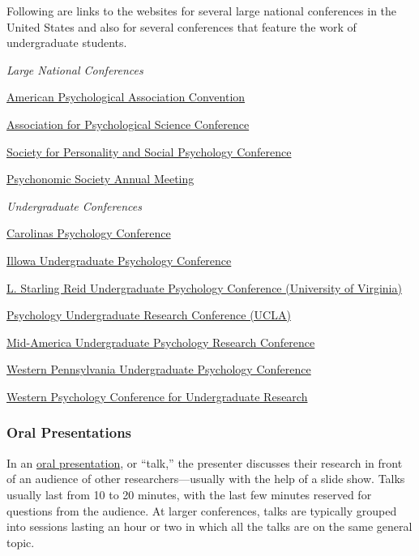 \documentclass[
]{krantz}
\begin{document}
Following are links to the websites for several large national conferences in the United States and also for several conferences that feature the work of undergraduate students.

\emph{Large National Conferences}

\href{https://convention.apa.org/}{American Psychological Association Convention}

\href{https://www.psychologicalscience.org/conventions}{Association for Psychological Science Conference}

\href{https://spsp.org/events/annual-convention}{Society for Personality and Social Psychology Conference}

\href{https://www.psychonomic.org/page/meetings}{Psychonomic Society Annual Meeting}

\emph{Undergraduate Conferences}

\href{https://education.campbell.edu/psychology/carolinas-psychology-conference/}{Carolinas Psychology Conference}

\href{http://research.monm.edu/illowa/}{Illowa Undergraduate Psychology Conference}

\href{https://psychology.as.virginia.edu/reid-conference}{L. Starling Reid Undergraduate Psychology Conference (University of Virginia)}

\href{https://purc.psych.ucla.edu/}{Psychology Undergraduate Research Conference (UCLA)}

\href{https://www.mauprc.org/}{Mid-America Undergraduate Psychology Research Conference}

\href{https://go.allegheny.edu/wpupc}{Western Pennsylvania Undergraduate Psychology Conference}

\href{https://www.stmarys-ca.edu/psychology/western-psychology-conference-for-undergraduate-research-wpcur}{Western Psychology Conference for Undergraduate Research}

\hypertarget{oral-presentations}{%
\subsubsection*{Oral Presentations}\label{oral-presentations}}


In an \protect\hyperlink{oral-presentation}{oral presentation}, or ``talk,'' the presenter discusses their research in front of an audience of other researchers---usually with the help of a slide show. Talks usually last from 10 to 20 minutes, with the last few minutes reserved for questions from the audience. At larger conferences, talks are typically grouped into sessions lasting an hour or two in which all the talks are on the same general topic.
\end{document}
